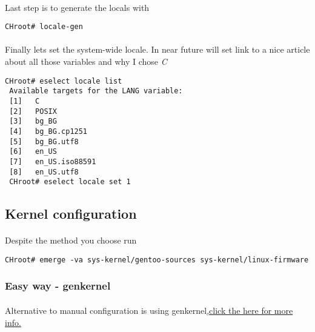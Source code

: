 \documentclass[11pt,a4paper]{article}
\begin{document}
\begin{enumerate}
                        \paragraph{} Last step is to generate the locals with

                        \begin{lstlisting}[style=BashInputCHRoot]
 CHroot# locale-gen
                        \end{lstlisting}

                        \paragraph{} Finally lets set the system-wide locale. In near future will set link to a nice article about all those variables and why I chose \textit{C}

                        \begin{lstlisting}[style=BashInputCHRoot]
 CHroot# eselect locale list
 Available targets for the LANG variable:
 [1]   C
 [2]   POSIX
 [3]   bg_BG
 [4]   bg_BG.cp1251
 [5]   bg_BG.utf8
 [6]   en_US
 [7]   en_US.iso88591
 [8]   en_US.utf8
 CHroot# eselect locale set 1
                        \end{lstlisting}

                \end{enumerate}

        \newpage
        \subsection{Kernel configuration}

            \paragraph{} Despite the method you choose run

            \begin{lstlisting}[style=BashInputCHRoot]
 CHroot# emerge -va sys-kernel/gentoo-sources sys-kernel/linux-firmware
            \end{lstlisting}

            \newpage
            \subsubsection{Easy way - genkernel}

                \paragraph{} Alternative to manual configuration is using genkernel\href{https://wiki.gentoo.org/wiki/Handbook:AMD64/Installation/Kernel#Alternative:_Using_genkernel}{,click the here for more info.}
\end{document}
